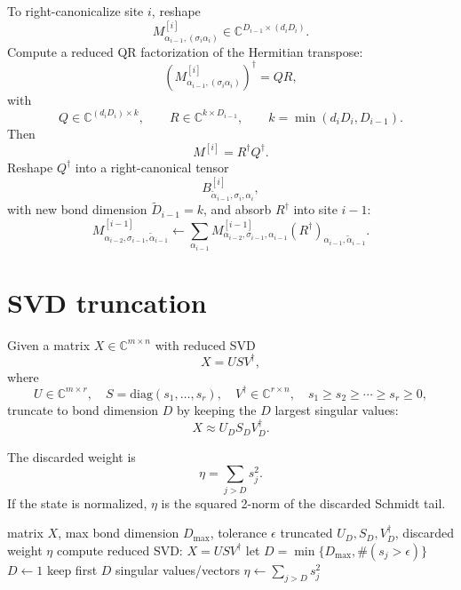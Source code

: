 \documentclass[aps,prb,onecolumn,nofootinbib]{revtex4-2}
\newcommand{\eps}{\epsilon}
\begin{document}
	To right-canonicalize site $i$, reshape
	\[
	M^{[i]}_{\alpha_{i-1},(\sigma_i\alpha_i)}
	\in \mathbb{C}^{D_{i-1}\times(d_iD_i)}.
	\]
	Compute a reduced QR factorization of the Hermitian transpose:
	\begin{equation}
		\left(M^{[i]}_{\alpha_{i-1},(\sigma_i\alpha_i)}\right)^\dagger = Q R,
	\end{equation}
	with
	\[
	Q\in\mathbb{C}^{(d_iD_i)\times k},\qquad
	R\in\mathbb{C}^{k\times D_{i-1}},\qquad
	k=\min(d_iD_i,D_{i-1}).
	\]
	Then
	\begin{equation}
		M^{[i]} = R^\dagger Q^\dagger.
	\end{equation}
	Reshape $Q^\dagger$ into a right-canonical tensor
	\[
	B^{[i]}_{\tilde\alpha_{i-1},\sigma_i,\alpha_i},
	\]
	with new bond dimension $\tilde D_{i-1}=k$, and absorb $R^\dagger$ into site $i-1$:
	\begin{equation}
		M^{[i-1]}_{\alpha_{i-2},\sigma_{i-1},\tilde\alpha_{i-1}}
		\leftarrow
		\sum_{\alpha_{i-1}}
		M^{[i-1]}_{\alpha_{i-2},\sigma_{i-1},\alpha_{i-1}}
		(R^\dagger)_{\alpha_{i-1},\tilde\alpha_{i-1}}.
	\end{equation}
	
	\section{SVD truncation}
	
	Given a matrix $X\in\mathbb{C}^{m\times n}$ with reduced SVD
	\begin{equation}
		X = U S V^\dagger,
	\end{equation}
	where
	\[
	U\in\mathbb{C}^{m\times r},\quad
	S=\mathrm{diag}(s_1,\dots,s_r),\quad
	V^\dagger\in\mathbb{C}^{r\times n},\quad
	s_1\ge s_2\ge \cdots \ge s_r\ge 0,
	\]
	truncate to bond dimension $D$ by keeping the $D$ largest singular values:
	\begin{equation}
		X \approx U_D S_D V_D^\dagger.
	\end{equation}
	
	The discarded weight is
	\begin{equation}
		\eta = \sum_{j>D} s_j^2.
	\end{equation}
	If the state is normalized, $\eta$ is the squared 2-norm of the discarded Schmidt tail.
	
	\begin{algorithm}[H]
		\caption{TruncateBySVD}
		\begin{algorithmic}[1]
			\Require matrix $X$, max bond dimension $D_{\max}$, tolerance $\eps$
			\Ensure truncated $U_D,S_D,V_D^\dagger$, discarded weight $\eta$
			\State compute reduced SVD: $X = U S V^\dagger$
			\State let $D = \min\{D_{\max},\#(s_j > \eps)\}$
			\State $D\gets 1$
			\EndIf
			\State keep first $D$ singular values/vectors
			\State $\eta \gets \sum_{j>D} s_j^2$
		\end{algorithmic}
	\end{algorithm}
	
\end{document}
